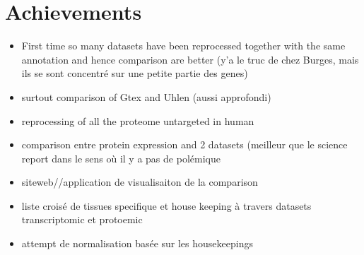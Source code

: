 \section{Achievements}
\begin{itemize}
    \item First time so many datasets have been reprocessed together with the
        same annotation and hence comparison are better (y'a le truc de chez Burges,
        mais ils se sont concentré sur une petite partie des genes)
    \item surtout comparison of Gtex and Uhlen (aussi approfondi)
    \item reprocessing of all the proteome untargeted in human
    \item comparison entre protein expression and 2 datasets (meilleur que le
        science report dans le sens où il y a pas de polémique
    \item siteweb//application de visualisaiton de la comparison
    \item liste croisé de tissues specifique et house keeping à travers datasets
        transcriptomic et protoemic
    \item attempt de normalisation basée sur les housekeepings
\end{itemize}
